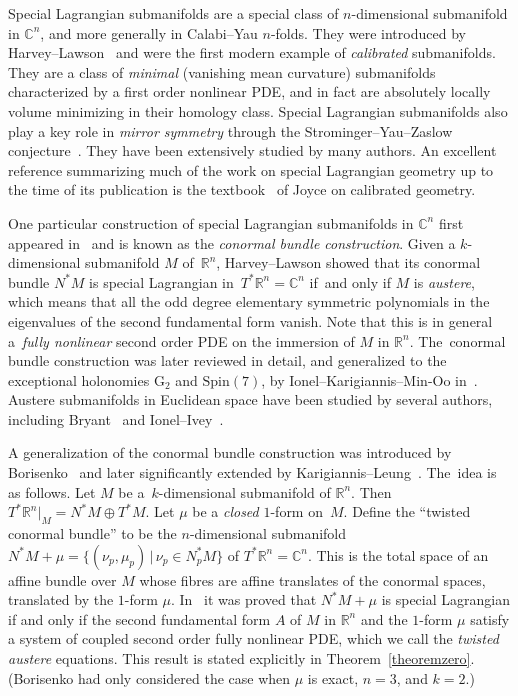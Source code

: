 \documentclass[pdftex]{sigma}
\def\R{\mathbb{R}}
\def\C{\mathbb{C}}
\numberwithin{equation}{section}
\begin{document}
Special Lagrangian submanifolds are a special class of $n$-dimensional submanifold in $\C^n$, and more generally in Calabi--Yau $n$-folds. They were introduced by Harvey--Lawson~\cite{HL} and were the first modern example of \emph{calibrated} submanifolds. They are a class of \emph{minimal} (vanishing mean curvature) submanifolds characterized by a first order nonlinear PDE, and in fact are absolutely locally volume minimizing in their homology class. Special Lagrangian submanifolds also play a key role in \emph{mirror symmetry} through the Strominger--Yau--Zaslow conjecture~\cite{SYZ}. They have been extensively studied by many authors. An excellent reference summarizing much of the work on special Lagrangian geometry up to the time of its publication is the textbook~\cite{J-book} of Joyce on calibrated geometry.

One particular construction of special Lagrangian submanifolds in $\C^n$ first appeared in~\cite{HL} and is known as the \emph{conormal bundle construction}. Given a $k$-dimensional submanifold $M$ of~$\R^n$, Harvey--Lawson showed that its conormal bundle $N^*M$ is special Lagrangian in~\mbox{$T^* \R^n = \C^n$} if~and only if $M$ is \emph{austere}, which means that all the odd degree elementary symmetric polynomials in the eigenvalues of the second fundamental form vanish. Note that this is in general a~\emph{fully nonlinear} second order PDE on the immersion of $M$ in $\R^n$. The~conormal bundle construction was later reviewed in detail, and generalized to the exceptional holonomies $\mathrm{G}_2$ and $\mathrm{Spin}(7)$, by Ionel--Karigiannis--Min-Oo in~\cite{IKM}. Austere submanifolds in Euclidean space have been studied by several authors, including Bryant~\cite{Br} and Ionel--Ivey~\cite{II,II2}.

A generalization of the conormal bundle construction was introduced by Borisenko~\cite{Bo} and later significantly extended by Karigiannis--Leung~\cite{KL}. The~idea is as follows. Let $M$ be a~$k$-dimen\-sional submanifold of $\R^n$. Then $T^* \R^n |_M = N^* M \oplus T^* M$. Let $\mu$ be a \emph{closed} $1$-form on~$M$. Define the ``twisted conormal bundle'' to be the $n$-dimensional submanifold $N^* M + \mu = \{ (\nu_p, \mu_p) \,|\, \nu_p \in N^*_p M \}$ of $T^* \R^n = \C^n$. This is the total space of an affine bundle over $M$ whose fibres are affine translates of the conormal spaces, translated by the $1$-form $\mu$. In~\cite{KL} it was proved that $N^* M+\mu$ is special Lagrangian if and only if the second fundamental form $A$ of $M$ in $\R^n$ and the $1$-form $\mu$ satisfy a system of coupled second order fully nonlinear PDE, which we call the \emph{twisted austere} equations. This result is stated explicitly in Theorem~\ref{theoremzero}. (Borisenko had only considered the case when $\mu$ is exact, $n=3$, and $k=2$.)
\end{document}
